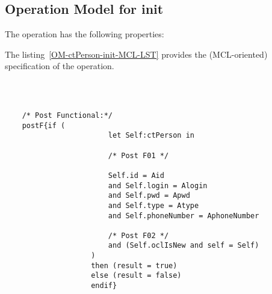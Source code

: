 \subsection{Operation Model for init}

\label{OM-init}


The  operation has the following properties:

	\begin{operationmodel}



		


	\end{operationmodel}



	\vspace{1cm}
	The listing~\ref{OM-ctPerson-init-MCL-LST} provides the \msrmessir (MCL-oriented) specification of the operation.
	
	\scriptsize
	\vspace{0.5cm}
	\begin{lstlisting}[style=MessirStyle,firstnumber=auto,captionpos=b,caption={\msrmessir (MCL-oriented) specification of the operation \emph{init}.},label=OM-ctPerson-init-MCL-LST]

	
	
	/* Post Functional:*/ 
	postF{if (
						let Self:ctPerson in
						
						/* Post F01 */
						
						Self.id = Aid
						and Self.login = Alogin
						and Self.pwd = Apwd
						and Self.type = Atype
						and Self.phoneNumber = AphoneNumber
				
				 		/* Post F02 */
				 		and (Self.oclIsNew and self = Self)
				 	)
				 	then (result = true)
				 	else (result = false)
				   	endif}
	
	
	\end{lstlisting}
	\normalsize 
	
	
	
	





